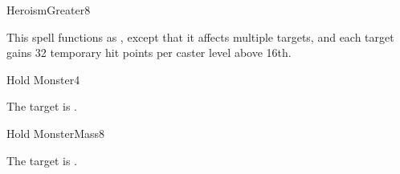 \begin{spellsection}{Heroism}{Greater}{8}
\begin{spellheader}
\end{spellheader}
\begin{spellcontent}
    \begin{spelltargetinginfo}
    \end{spelltargetinginfo}
    \begin{spelleffects}
        \spellspecial This spell functions as , except that it affects multiple targets, and each target gains 32 temporary hit points  per caster level above 16th.
    \end{spelleffects}
\end{spellcontent}
\begin{spellfooter}
\end{spellfooter}
\end{spellsection}

\begin{spellsection}{Hold Monster}{4}
\begin{spellheader}
\end{spellheader}
\begin{spellcontent}
    \begin{spelltargetinginfo}
    \end{spelltargetinginfo}
    \begin{spelleffects}
        \spelleffect The target is \immobilized.
        \spelldur \durshort
    \end{spelleffects}
\end{spellcontent}
\begin{spellfooter}
\end{spellfooter}
\end{spellsection}

\begin{spellsection}{Hold Monster}{Mass}{8}
\begin{spellheader}
\end{spellheader}
\begin{spellcontent}
    \begin{spelltargetinginfo}
    \end{spelltargetinginfo}
    \begin{spelleffects}
        \spelleffect The target is \immobilized.
        \spelldur \durshort
    \end{spelleffects}
\end{spellcontent}
\begin{spellfooter}
\end{spellfooter}
\end{spellsection}

